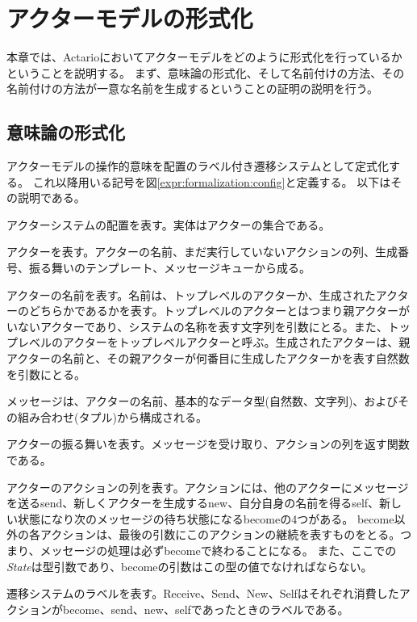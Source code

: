 \chapter{アクターモデルの形式化}
\label{chapter:formalization}

本章では、Actarioにおいてアクターモデルをどのように形式化を行っているかということを説明する。
まず、意味論の形式化、そして名前付けの方法、その名前付けの方法が一意な名前を生成するということの証明の説明を行う。


\section{意味論の形式化}

アクターモデルの操作的意味を配置のラベル付き遷移システムとして定式化する。
これ以降用いる記号を図\ref{expr:formalization:config}と定義する。
以下はその説明である。

\begin{description}[style=nextline,leftmargin=12pt,parsep=0pt]
\item[\textit{Configuration}]
  アクターシステムの配置を表す。実体はアクターの集合である。
\item[\textit{Actor}]
  アクターを表す。アクターの名前、まだ実行していないアクションの列、生成番号、振る舞いのテンプレート、メッセージキューから成る。
\item[\textit{Name}]
  アクターの名前を表す。名前は、トップレベルのアクターか、生成されたアクターのどちらかであるかを表す。トップレベルのアクターとはつまり親アクターがいないアクターであり、システムの名称を表す文字列を引数にとる。また、トップレベルのアクターをトップレベルアクターと呼ぶ。生成されたアクターは、親アクターの名前と、その親アクターが何番目に生成したアクターかを表す自然数を引数にとる。
\item[\textit{Message}]
  メッセージは、アクターの名前、基本的なデータ型(自然数、文字列)、およびその組み合わせ(タプル)から構成される。
\item[\textit{Behavior State}]
  アクターの振る舞いを表す。メッセージを受け取り、アクションの列を返す関数である。
\item[\textit{Actions State}]
  アクターのアクションの列を表す。アクションには、他のアクターにメッセージを送る\textsf{send}、新しくアクターを生成する\textsf{new}、自分自身の名前を得る\textsf{self}、新しい状態になり次のメッセージの待ち状態になる\textsf{become}の4つがある。
  \textsf{become}以外の各アクションは、最後の引数にこのアクションの継続を表すものをとる。つまり、メッセージの処理は必ず\textsf{become}で終わることになる。
  また、ここでの\textit{State}は型引数であり、\textsf{become}の引数はこの型の値でなければならない。
\item[\textit{Label}]
  遷移システムのラベルを表す。\textsf{Receive}、\textsf{Send}、\textsf{New}、\textsf{Self}はそれぞれ消費したアクションが\textsf{become}、\textsf{send}、\textsf{new}、\textsf{self}であったときのラベルである。
\end{description}


